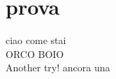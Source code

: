 \documentclass{article}
\begin{document}
    \section{prova}
        ciao come stai\\
        ORCO BOIO\\
        Another try! ancora una
\end{document}
